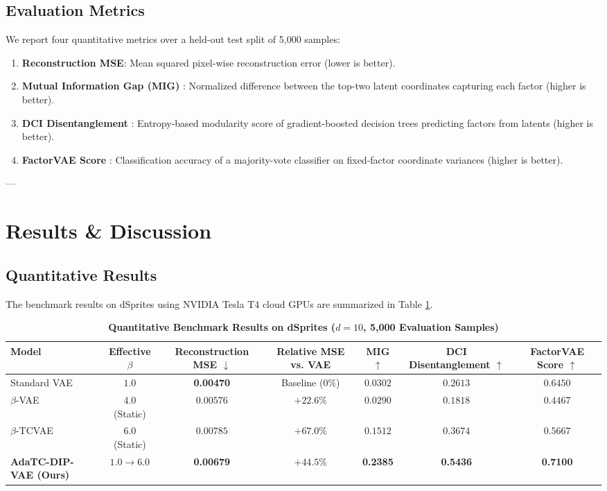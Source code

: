 \documentclass[10pt,journal,compsoc]{IEEEtran}
\begin{document}
\subsection{Evaluation Metrics}
We report four quantitative metrics over a held-out test split of 5,000 samples:
\begin{enumerate}
    \item \textbf{Reconstruction MSE}: Mean squared pixel-wise reconstruction error (lower is better).
    \item \textbf{Mutual Information Gap (MIG)} \cite{chen2018isolating}: Normalized difference between the top-two latent coordinates capturing each factor (higher is better).
    \item \textbf{DCI Disentanglement} \cite{eastwood2018framework, locatello2019challenging}: Entropy-based modularity score of gradient-boosted decision trees predicting factors from latents (higher is better).
    \item \textbf{FactorVAE Score} \cite{kim2018disentangling}: Classification accuracy of a majority-vote classifier on fixed-factor coordinate variances (higher is better).
\end{enumerate}

---

\section{Results \& Discussion}

\subsection{Quantitative Results}
The benchmark results on dSprites using NVIDIA Tesla T4 cloud GPUs are summarized in Table \ref{tab:results}.

\begin{table}[!t]
\centering
\caption{\textbf{Quantitative Benchmark Results on dSprites ($d=10$, 5,000 Evaluation Samples)}}
\label{tab:results}
\begin{tabular*}{\textwidth}{@{\extracolsep{\fill}}lcccccc@{}}
\toprule
\textbf{Model} & \textbf{Effective $\beta$} & \textbf{Reconstruction MSE} $\downarrow$ & \textbf{Relative MSE vs. VAE} & \textbf{MIG} $\uparrow$ & \textbf{DCI Disentanglement} $\uparrow$ & \textbf{FactorVAE Score} $\uparrow$ \\
\midrule
Standard VAE \cite{kingma2013auto} & $1.0$ & \textbf{0.00470} & Baseline ($0\%$) & $0.0302$ & $0.2613$ & $0.6450$ \\
$\beta$-VAE \cite{higgins2017beta} & $4.0$ (Static) & $0.00576$ & $+22.6\%$ & $0.0290$ & $0.1818$ & $0.4467$ \\
$\beta$-TCVAE \cite{chen2018isolating} & $6.0$ (Static) & $0.00785$ & $+67.0\%$ & $0.1512$ & $0.3674$ & $0.5667$ \\
\midrule
\textbf{AdaTC-DIP-VAE (Ours)} & $1.0 \to 6.0$ & \textbf{0.00679} & \textbf{$+44.5\%$} & \textbf{0.2385} & \textbf{0.5436} & \textbf{0.7100} \\
\bottomrule
\end{tabular*}
\end{table}
\end{document}
